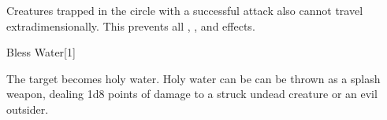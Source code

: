 
Creatures trapped in the circle with a successful attack also cannot travel extradimensionally.
This prevents all , , and  effects.






\begin{spellsection}{Bless Water}[1]

\begin{spellcontent}

\begin{spelltargetinginfo}



\end{spelltargetinginfo}


\begin{spelleffects}



\spelleffect
The target becomes holy water.
Holy water can be can be thrown as a splash weapon, dealing 1d8 points of damage to a struck undead creature or an evil outsider.






\end{spelleffects}

\end{spellcontent}
\begin{spellfooter}


\end{spellfooter}
\begin{spellsubcontent}


\end{spellsubcontent}
\end{spellsection}


